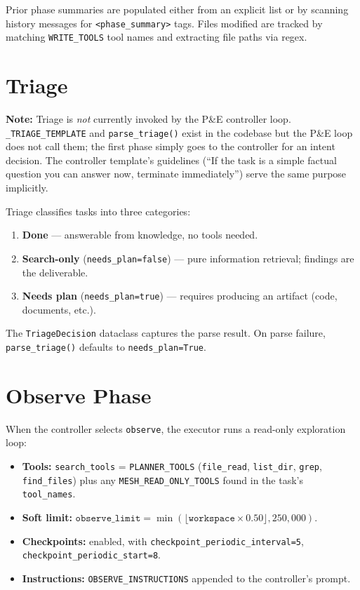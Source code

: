 \documentclass[11pt,letterpaper]{report}
\newcommand{\code}[1]{\texttt{#1}}
\begin{document}
Prior phase summaries are populated either from an explicit list or by
scanning history messages for \code{<phase\_summary>} tags.
Files modified are tracked by matching
\code{WRITE\_TOOLS} tool names and extracting file paths via regex.


\section{Triage}
\label{sec:triage}

\textbf{Note:} Triage is \emph{not} currently invoked by the P\&E
controller loop. \code{\_TRIAGE\_TEMPLATE} and
\code{parse\_triage()} exist in the codebase but
the P\&E loop does not call them; the first phase simply goes to the
controller for an intent decision. The controller template's guidelines
(``If the task is a simple factual question you can answer now, terminate
immediately'') serve the same purpose implicitly.

Triage classifies tasks into three categories:
\begin{enumerate}[nosep]
  \item \textbf{Done} --- answerable from knowledge, no tools needed.
  \item \textbf{Search-only} (\code{needs\_plan=false}) --- pure
        information retrieval; findings are the deliverable.
  \item \textbf{Needs plan} (\code{needs\_plan=true}) --- requires
        producing an artifact (code, documents, etc.).
\end{enumerate}

The \code{TriageDecision} dataclass captures the
parse result. On parse failure, \code{parse\_triage()} defaults to
\code{needs\_plan=True}.


\section{Observe Phase}
\label{sec:observe}

When the controller selects \code{observe}, the executor runs a
read-only exploration loop:

\begin{itemize}[nosep]
  \item \textbf{Tools:} \code{search\_tools} = \code{PLANNER\_TOOLS}
        (\code{file\_read}, \code{list\_dir}, \code{grep},
        \code{find\_files}) plus any \code{MESH\_READ\_ONLY\_TOOLS}
        found in the task's \code{tool\_names}.
  \item \textbf{Soft limit:}
        $\texttt{observe\_limit} = \min(\lfloor\texttt{workspace} \times 0.50\rfloor, 250{,}000)$.
  \item \textbf{Checkpoints:} enabled, with
        \code{checkpoint\_periodic\_interval=5},
        \code{checkpoint\_periodic\_start=8}.
  \item \textbf{Instructions:} \code{OBSERVE\_INSTRUCTIONS}
        appended to the controller's prompt.
\end{itemize}
\end{document}

